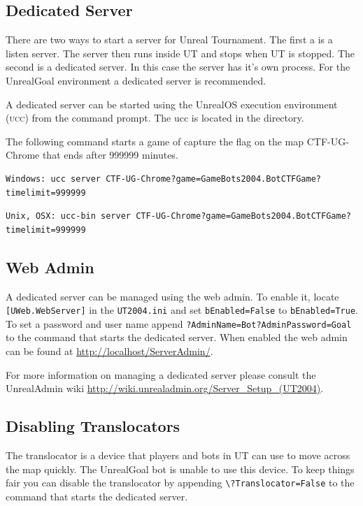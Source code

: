 \documentclass[11pt,a4paper]{article}
\begin{document}
\subsection{Dedicated Server}

There are two ways to start a server for Unreal Tournament. The first a is a listen server. The server then runs inside UT and stops when UT is stopped. The second is a dedicated server. In this case the server has it's own process. For the UnrealGoal environment a dedicated server is recommended. 

A dedicated server can be started using the UnrealOS execution environment (\textsc{ucc}) from the command prompt. The ucc is located in the  directory. 

The following command starts a game of capture the flag on the map CTF-UG-Chrome that ends after 999999 minutes. 

\begin{verbatim}
Windows: ucc server CTF-UG-Chrome?game=GameBots2004.BotCTFGame?timelimit=999999
\end{verbatim}	
\begin{verbatim}
Unix, OSX: ucc-bin server CTF-UG-Chrome?game=GameBots2004.BotCTFGame?timelimit=999999
\end{verbatim}	


\subsection{Web Admin}

A dedicated server can be managed using the web admin. To enable it, locate \texttt{[UWeb.WebServer]} in the \texttt{UT2004.ini} and set \texttt{bEnabled=False} to \texttt{bEnabled=True}. To set a password and user name append \verb|?AdminName=Bot?AdminPassword=Goal| to the command that starts the dedicated server. When enabled the web admin can be found at \url{http://localhost/ServerAdmin/}. 

For more information on managing a dedicated server please consult the UnrealAdmin wiki \url{http://wiki.unrealadmin.org/Server_Setup_(UT2004)}.

\subsection{Disabling Translocators}

The translocator is a device that players and bots in UT can use to move across the map quickly. The UnrealGoal bot is unable to use this device. To keep things fair you can disable the translocator by appending \verb|\?Translocator=False| to the command that starts the dedicated server.
\end{document}
